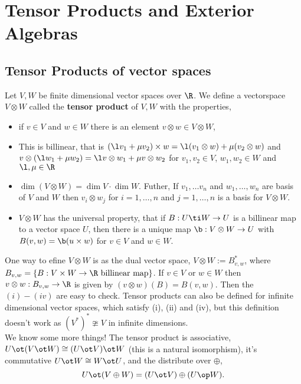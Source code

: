 
\section{Tensor Products and Exterior Algebras}
\subsection{Tensor Products of vector spaces}

\begin{ndefi}[]
  Let $V,W$ be finite dimensional vector spaces over $\R$. We define a vectorspace $V \otimes W$ called the \textbf{tensor product} of $V, W$ with the properties,
  \begin{itemize}
    \item if $v \in V$ and $w \in W$ there is an element $v\otimes w \in V \otimes W$,
    \item This is billinear, that is $(\l v_1 + \mu v_2) \times w = \l (v_1 \otimes w) + \mu (v_2 \otimes w)$ and $v \otimes (\l w_1 + \mu w_2) = \l v \otimes w_1 + \mu v \otimes w_2$ for $v_1, v_2 \in V$, $w_1, w_2 \in W$ and $\l, \mu \in \R$
    \item $\dim (V \otimes W) = \dim V \cdot \dim W$. Futher, If $v_1, \dots v_n$ and $w_1, \dots, w_n$ are basis of $V$ and $W$ then $v_i \otimes w_j$ for $i = 1, \dots, n$ and $j = 1, \dots, n$ is a basis for $V \otimes W$.
    \item $V \otimes W$ has the universal property, that if $B : U \ti W \to U$ is a billinear map to a vector space $U$, then there is a unique map $\b : V \otimes W \to U$ with $B(v, w) = \b (u \times w)$ for $v \in V$ and $w \in W$.
  \end{itemize}
\end{ndefi}

One way to efine $V \otimes W$ is as the dual vector space, $V \otimes W := B^*_{v, w}$, where $B_{v, w} = \{B : V \times W \to \R \text{ billinear map}\}$. If $v \in V$ or $w \in W$ then $v \otimes w : B_{v, w} \to \R$ is given by $(v \otimes w)(B) = B(v, w)$. Then the $(i) - (iv)$ are easy to check. Tensor products can also be defined for infinite dimensional vector spaces, which satisfy (i), (ii) and (iv), but this definition doesn't work as $(V^*)^* \ncong V$ in infinite dimensions.\\

\noindent
We know some more things! The tensor product is associative, $U \ot (V \ot W) \cong (U \ot V)\ot W$ (this is a natural isomorphism), it's commutative $U \ot W \cong W \ot U$, and the distribute over $\oplus$,
$$ U \ot (V \oplus W) = (U\ot V) \oplus (U \op W). $$

